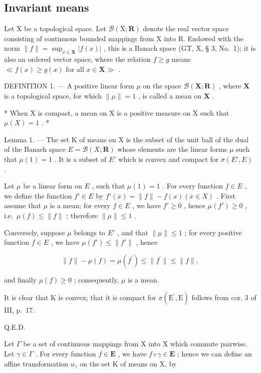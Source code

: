 \subsection{Invariant means}

Let X be a topological space. Let \(\mathcal{B}(\mathrm{X};\mathbf{R})\) denote the real vector space consisting of continuous bounded mappings from X into R. Endowed with the norm \(\| f\| = \sup_{x\in \mathbf{X}}|f(x)|\) , this is a Banach space (GT, X, § 3, No.~1); it is also an ordered vector space, where the relation \(f\geqslant g\) means \(\ll f(x)\geqslant g(x) \text{ for all } x\in \mathbf{X}\gg\) .

DEFINITION 1. --- A positive linear form \(\mu\) on the space \(\mathcal{B}(\mathbf{X};\mathbf{R})\) , where \(\mathbf{X}\) is a topological space, for which \(\|\mu\| = 1\) , is called a mean on \(\mathbf{X}\) .

* When X is compact, a mean on X is a positive measure on X such that \(\mu(X)=1\) . *

Lemma 1. --- The set K of means on X is the subset of the unit ball of the dual of the Banach space \(E = \mathcal{B}(X; \mathbf{R})\) whose elements are the linear forms \(\mu\) such that \(\mu(1)=1\) . It is a subset of \(E'\) which is convex and compact for \(\sigma(E', E)\) .

Let \(\mu\) be a linear form on \(E\) , such that \(\mu(1) = 1\) . For every function \(f \in E\) , we define the function \(f' \in E\) by \(f'(x) = \| f \| - f(x) (x \in X)\) . First assume that \(\mu\) is a mean; for every \(f \in E\) , we have \(f' \geqslant 0\) , hence \(\mu(f') \geqslant 0\) , i.e.~\(\mu(f) \leqslant \| f \|\) ; therefore \(\|\mu\| \leqslant 1\) .

Conversely, suppose \(\mu\) belongs to \(E'\) , and that \(\| \mu \| \leqslant 1\) ; for every positive function \(f \in E\) , we have \(\mu(f') \leqslant \| f'\|\) , hence

\[
\| f \| - \mu (f) = \mu \left(f ^ {\prime}\right) \leqslant \| f ^ {\prime} \| \leqslant \| f \|,
\]

and finally \(\mu(f) \geqslant 0\) ; consequently, \(\mu\) is a mean.

It is clear that K is convex; that it is compact for \(\sigma(\mathrm{E}^{\prime},\mathrm{E})\) follows from cor. 3 of III, p.~17.

Q.E.D.

Let \(\Gamma\) be a set of continuous mappings from X into X which commute pairwise. Let \(\gamma \in \Gamma\) . For every function \(f \in \mathbf{E}\) , we have \(f \circ \gamma \in \mathbf{E}\) ; hence we can define an affine transformation \(u_{\gamma}\) on the set K of means on X, by

